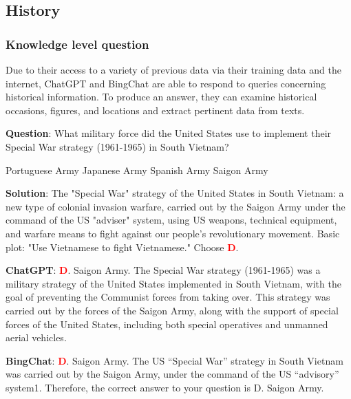 \documentclass{article}
\begin{document}
{\begin{mdframed}[linewidth=1pt,linecolor=red]
	\end{mdframed}
	
	\subsection{History}
	\label{VNHSGE_His}
	
	\subsubsection{Knowledge level question}
	\label{VNHSGE_His_K}
	
	Due to their access to a variety of previous data via their training data and the internet, ChatGPT and BingChat are able to respond to queries concerning historical information. To produce an answer, they can examine historical occasions, figures, and locations and extract pertinent data from texts.
	
	
	
	\begin{mdframed}[linewidth=1pt,linecolor=red] \textbf{Question}: What military force did the United States use to implement their Special War strategy (1961-1965) in South Vietnam? 
		
		\begin{oneparchoices}
			\choice Portuguese Army 
			\choice Japanese Army
			\choice Spanish Army
			\choice Saigon Army
		\end{oneparchoices}
		
		\textbf{Solution}: The "Special War" strategy of the United States in South Vietnam: a new type of colonial invasion warfare, carried out by the Saigon Army under the command of the US "adviser" system, using US weapons, technical equipment, and warfare means to fight against our people's revolutionary movement. Basic plot: "Use Vietnamese to fight Vietnamese."
		Choose \textcolor{red}{\textbf{D}}.
		
		\textbf{ChatGPT}: \textcolor{red}{\textbf{D}}. Saigon Army. The Special War strategy (1961-1965) was a military strategy of the United States implemented in South Vietnam, with the goal of preventing the Communist forces from taking over. This strategy was carried out by the forces of the Saigon Army, along with the support of special forces of the United States, including both special operatives and unmanned aerial vehicles.
		
		\textbf{BingChat}: \textcolor{red}{\textbf{D}}. Saigon Army. The US “Special War” strategy in South Vietnam was carried out by the Saigon Army, under the command of the US “advisory” system1. Therefore, the correct answer to your question is D. Saigon Army.
		

\end{mdframed}}
\end{document}
